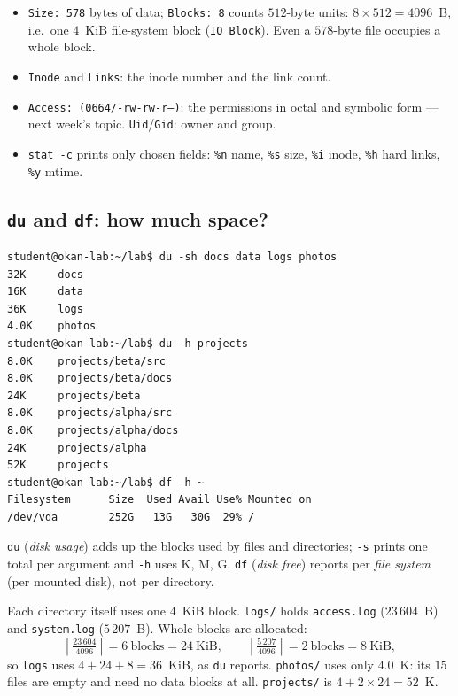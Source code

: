 \documentclass[11pt,a4paper]{article}
\newcommand{\cmd}[1]{\texttt{#1}}
\begin{document}
\begin{itemize}
  \item \texttt{Size: 578} bytes of data; \texttt{Blocks: 8} counts $512$-byte units: $8 \times 512 = 4096$~B, i.e.\ one $4$~KiB file-system block (\texttt{IO Block}). Even a $578$-byte file occupies a whole block.
  \item \texttt{Inode} and \texttt{Links}: the inode number and the link count.
  \item \texttt{Access: (0664/-rw-rw-r--)}: the permissions in octal and symbolic form --- next week's topic. \texttt{Uid}/\texttt{Gid}: owner and group.
  \item \cmd{stat -c} prints only chosen fields: \texttt{\%n} name, \texttt{\%s} size, \texttt{\%i} inode, \texttt{\%h} hard links, \texttt{\%y} mtime.
\end{itemize}

\subsection{\texttt{du} and \texttt{df}: how much space?}

\begin{lstlisting}[style=term]
student@okan-lab:~/lab$ du -sh docs data logs photos
32K     docs
16K     data
36K     logs
4.0K    photos
student@okan-lab:~/lab$ du -h projects
8.0K    projects/beta/src
8.0K    projects/beta/docs
24K     projects/beta
8.0K    projects/alpha/src
8.0K    projects/alpha/docs
24K     projects/alpha
52K     projects
student@okan-lab:~/lab$ df -h ~
Filesystem      Size  Used Avail Use% Mounted on
/dev/vda        252G   13G   30G  29% /
\end{lstlisting}

\cmd{du} (\emph{disk usage}) adds up the blocks used by files and directories; \cmd{-s} prints one total per argument and \cmd{-h} uses K, M, G. \cmd{df} (\emph{disk free}) reports per \emph{file system} (per mounted disk), not per directory.

\begin{example}
Each directory itself uses one $4$~KiB block. \texttt{logs/} holds \texttt{access.log} ($23\,604$~B) and \texttt{system.log} ($5\,207$~B). Whole blocks are allocated:
\[
\left\lceil \tfrac{23\,604}{4096} \right\rceil = 6 \ \text{blocks} = 24\ \text{KiB}, \qquad
\left\lceil \tfrac{5\,207}{4096} \right\rceil = 2 \ \text{blocks} = 8\ \text{KiB},
\]
so \texttt{logs} uses $4 + 24 + 8 = 36$~KiB, as \cmd{du} reports. \texttt{photos/} uses only $4.0$~K: its $15$ files are empty and need no data blocks at all. \texttt{projects/} is $4 + 2 \times 24 = 52$~K.
\end{example}
\end{document}
